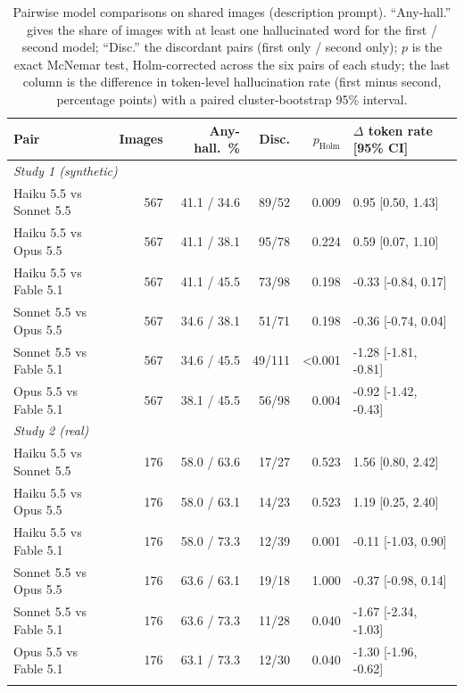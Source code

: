 \documentclass[pdflatex,sn-mathphys-num]{sn-jnl}%
\theoremstyle{thmstyleone}%
\theoremstyle{thmstyletwo}%
\theoremstyle{thmstylethree}%
\begin{document}
\begin{appendices}
\begin{table}[!tbp]
\caption{Pairwise model comparisons on shared images (description prompt). ``Any-hall.'' gives the share of images with at least one hallucinated word for the first / second model; ``Disc.'' the discordant pairs (first only / second only); $p$ is the exact McNemar test, Holm-corrected across the six pairs of each study; the last column is the difference in token-level hallucination rate (first minus second, percentage points) with a paired cluster-bootstrap 95\% interval.}\label{tab:pairs}
\footnotesize
\setlength{\tabcolsep}{3pt}
\begin{tabular*}{\textwidth}{@{\extracolsep\fill}lrrrrl}
\toprule
Pair & Images & Any-hall.\ \% & Disc. & $p_\mathrm{Holm}$ & $\Delta$ token rate [95\% CI] \\
\midrule
\multicolumn{6}{l}{\emph{Study 1 (synthetic)}} \\
Haiku 5.5 vs Sonnet 5.5 & 567 & 41.1 / 34.6 & 89/52 & 0.009 & 0.95 [0.50, 1.43] \\
Haiku 5.5 vs Opus 5.5 & 567 & 41.1 / 38.1 & 95/78 & 0.224 & 0.59 [0.07, 1.10] \\
Haiku 5.5 vs Fable 5.1 & 567 & 41.1 / 45.5 & 73/98 & 0.198 & -0.33 [-0.84, 0.17] \\
Sonnet 5.5 vs Opus 5.5 & 567 & 34.6 / 38.1 & 51/71 & 0.198 & -0.36 [-0.74, 0.04] \\
Sonnet 5.5 vs Fable 5.1 & 567 & 34.6 / 45.5 & 49/111 & <0.001 & -1.28 [-1.81, -0.81] \\
Opus 5.5 vs Fable 5.1 & 567 & 38.1 / 45.5 & 56/98 & 0.004 & -0.92 [-1.42, -0.43] \\
\multicolumn{6}{l}{\emph{Study 2 (real)}} \\
Haiku 5.5 vs Sonnet 5.5 & 176 & 58.0 / 63.6 & 17/27 & 0.523 & 1.56 [0.80, 2.42] \\
Haiku 5.5 vs Opus 5.5 & 176 & 58.0 / 63.1 & 14/23 & 0.523 & 1.19 [0.25, 2.40] \\
Haiku 5.5 vs Fable 5.1 & 176 & 58.0 / 73.3 & 12/39 & 0.001 & -0.11 [-1.03, 0.90] \\
Sonnet 5.5 vs Opus 5.5 & 176 & 63.6 / 63.1 & 19/18 & 1.000 & -0.37 [-0.98, 0.14] \\
Sonnet 5.5 vs Fable 5.1 & 176 & 63.6 / 73.3 & 11/28 & 0.040 & -1.67 [-2.34, -1.03] \\
Opus 5.5 vs Fable 5.1 & 176 & 63.1 / 73.3 & 12/30 & 0.040 & -1.30 [-1.96, -0.62] \\
\botrule
\end{tabular*}
\end{table}



\end{appendices}
\end{document}

